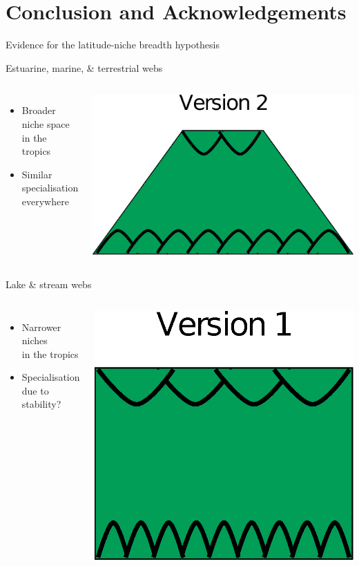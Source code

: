 \documentclass{beamer}
\begin{document}
\section*{Conclusion and Acknowledgements}
  \begin{frame}{Evidence for the latitude-niche breadth hypothesis}
    \begin{block}{Estuarine, marine, \& terrestrial webs}
      \begin{columns}
      \column{2.5in}
        \begin{itemize}
          \item Broader niche space\\ in the tropics
          \item Similar specialisation\\ everywhere
        \end{itemize}
      \column{1in}

        \begin{center}

        \includegraphics[height=.75in]{Figures/version2.eps}

        \end{center}

      \column{.5in}
      \end{columns}
    \end{block}

    \begin{block}{Lake \& stream webs}
      \begin{columns}
      \column{2.5in}
      \begin{itemize}
        \item Narrower niches\\ in the tropics
        \item Specialisation\\ due to stability?
      \end{itemize}
      \column{1in}

        \begin{center}
      
        \includegraphics[height=.75in]{Figures/version1.eps}
      
        \end{center}
      
      \column{.5in}
    \end{columns}
    \end{block}
  \end{frame}
\end{document}
